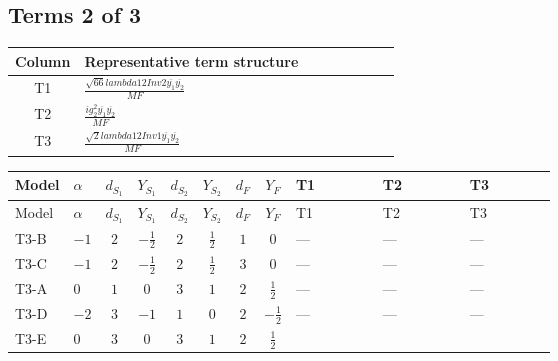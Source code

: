 \documentclass[8pt]{article}
\begin{document}
\begin{landscape}
\subsection*{Terms 2 of 3}
\begin{center}
\begin{tabular}{@{}c >{\raggedright\arraybackslash}p{0.82\linewidth}@{}}
\toprule
Column & Representative term structure \\
\midrule
T1 & \(\displaystyle \frac{\sqrt{66} lambda12Inv2 \overline{y_{1}} \overline{y_{2}}}{MF}\) \\
\midrule
T2 & \(\displaystyle \frac{i g_{2}^{2} \overline{y_{1}} \overline{y_{2}}}{MF}\) \\
\midrule
T3 & \(\displaystyle \frac{\sqrt{2} lambda12Inv1 \overline{y_{1}} \overline{y_{2}}}{MF}\) \\
\midrule
\bottomrule
\end{tabular}
\end{center}
\smallskip
\tiny
\begin{longtable}{@{}llcccccc >{\raggedright\arraybackslash}p{0.21\linewidth} >{\raggedright\arraybackslash}p{0.21\linewidth} >{\raggedright\arraybackslash}p{0.21\linewidth}@{}}
\toprule
Model & $\alpha$ & $d_{S_1}$ & $Y_{S_1}$ & $d_{S_2}$ & $Y_{S_2}$ & $d_F$ & $Y_F$ & T1 & T2 & T3 \\
\midrule
\endfirsthead
\toprule
Model & $\alpha$ & $d_{S_1}$ & $Y_{S_1}$ & $d_{S_2}$ & $Y_{S_2}$ & $d_F$ & $Y_F$ & T1 & T2 & T3 \\
\midrule
\endhead
T3-B & $-1$ & $2$ & $-\frac{1}{2}$ & $2$ & $\frac{1}{2}$ & $1$ & $0$ & --- & --- & --- \\
\midrule
T3-C & $-1$ & $2$ & $-\frac{1}{2}$ & $2$ & $\frac{1}{2}$ & $3$ & $0$ & --- & --- & --- \\
\midrule
T3-A & $0$ & $1$ & $0$ & $3$ & $1$ & $2$ & $\frac{1}{2}$ & --- & --- & --- \\
\midrule
T3-D & $-2$ & $3$ & $-1$ & $1$ & $0$ & $2$ & $-\frac{1}{2}$ & --- & --- & --- \\
\midrule
T3-E & $0$ & $3$ & $0$ & $3$ & $1$ & $2$ & $\frac{1}{2}$ & \scriptsize\adjustbox{max width=\linewidth}{$\begin{gathered} - \frac{3 \sqrt{66} lambda12Inv2 \overline{y_{1}} \overline{y_{2}}}{44 MF}\end{gathered}$} & \scriptsize\adjustbox{max width=\linewidth}{$\begin{gathered} - \frac{i g_{2}^{2} \overline{y_{1}} \overline{y_{2}}}{2 MF}\end{gathered}$} & \scriptsize\adjustbox{max width=\linewidth}{$\begin{gathered} \frac{\sqrt{2} lambda12Inv1 \overline{y_{1}} \overline{y_{2}}}{4 MF}\end{gathered}$} \\
\midrule
\bottomrule
\end{longtable}
\clearpage

\end{landscape}
\end{document}

